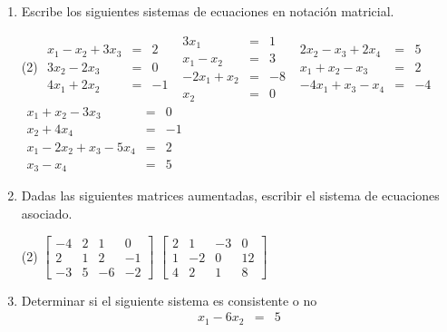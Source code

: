 \documentclass[12pt]{article}
\newenvironment{preguntas}
{\begin{enumerate}\itemsep12pt
	}
	{
	\end{enumerate}
}
\newcommand{\R}{\mathbb{R}}
\begin{document}
\begin{preguntas}
\begin{enumerate}[a)]
\item Demuestre que si $a$ y $b\in\R^3$ el vector $b-proy_a b$ es ortogonal a $a$.
\end{enumerate}
\item Escribe los siguientes sistemas de ecuaciones en notación matricial.
\begin{tasks}(2)
\task $
		\begin{array}{rcr}
		x_1 -x_2 + 3x_3 & = & 2\\
		3x_2 - 2x_3 & = & 0\\
		4x_1 +2x_2 & = & -1
		\end{array}
		$
\task $
		\begin{array}{rcr}
		3x_1 & = & 1\\
		x_1-x_2& = & 3\\
		-2x_1+x_2 & = & -8\\
		x_2 & = & 0
		\end{array}
		$
\task $
		\begin{array}{rcr}
		2x_2 -x_3 +2x_4& = & 5\\
		x_1+x_2 - x_3 & = & 2\\
		-4x_1 +x_3-x_4& = & -4
		\end{array}
		$
\task $
		\begin{array}{rcr}
		x_1 +x_2-3x_3& = & 0\\
		x_2+4x_4& = & -1\\
		x_1-2x_2+x_3-5x_4 & = & 2\\
		x_3-x_4 & = & 5
		\end{array}
		$
\end{tasks}
\item Dadas las siguientes matrices aumentadas, escribir el sistema de ecuaciones asociado.
\begin{tasks}(2)
\task $
		\begin{bmatrix}
		-4 & 2 & 1 &  0\\
		2  & 1 & 2 & -1\\
		-3 & 5 &-6& -2
		\end{bmatrix}
		$
\task $
		\begin{bmatrix}
		2 & 1 & -3 & 0\\
		1  & -2 & 0 & 12\\
		4 & 2 &1& 8
		\end{bmatrix}
		$
\end{tasks}
\item Determinar si el siguiente sistema es consistente o no
	$$
	\begin{array}{rcr}
	x_1 -6x_2& = & 5\\

\end{array}$$
\end{preguntas}
\end{document}
